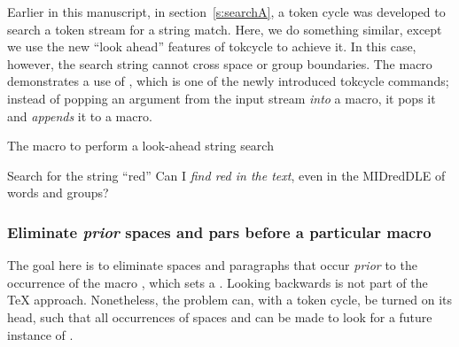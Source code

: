 \documentclass[10pt]{article}
\newcommand\TokCycle{\textsf{tokcycle}}
\begin{document}
Earlier in this manuscript, in section~\ref{s:searchA}, a token cycle
  was developed to search a token stream for a string match.
Here, we do something similar, except we use the new ``look ahead'' features
  of \TokCycle{} to achieve it.
In this case, however, the search string cannot cross space or group
  boundaries.
The  macro demonstrates a use of ,
  which is one of the newly introduced \TokCycle{} commands; instead of 
  popping an argument from the input stream \textit{into} a macro, it pops it 
  and \textit{appends} it to a macro.

\begin{exampleC}[]{The  macro to perform a look{-}ahead string
  search}
\newcommand\findstring[4]{%
  \foundstringfalse%
  \def\poptoks{}%
  \expandafter\matchnextchar\ifx#1#2\relax\relax\fi\empty\relax
  \iffoundstring\addcytoks{#3{#2}}\else\tcpush{\poptoks}#4\fi
}
\def\matchnextchar#1#2\relax{\tctestifx{#1\empty}{}{%
  \tctestifx{\relax#1}{%
    \foundstringtrue%
  }{%
    \tcpeek\Q%
    \tctestifx{\Q\bgroup}{}{%
      \tctestifx{\Q\tcsptoken}{}{%
        \tcpopappto\poptoks%
        \expandafter\tctestifx\expandafter{\Q#1}{%
          \matchnextchar#2\relax%
        }{}%
      }%
    }%
  }%
}}
\end{exampleC}

\begin{exampleA}[lefthand width=8cm]{Search for the string ``red''}
\resettokcycle
{}
\tokencyclexpress 
Can I \textit{find red in the text}, even in the 
  MIDredDLE of words and groups?
\endtokencyclexpress
\end{exampleA}

\endgroup


\subsubsection{Eliminate \textit{prior} spaces and pars before a particular
  macro}

The goal here is to eliminate spaces and paragraphs that occur 
  \textit{prior} to the occurrence of the macro , which 
  sets a .
Looking backwards is not part of the \TeX{} approach.
Nonetheless, the problem can, with a token cycle, be turned on its head,
  such that all occurrences of spaces and  can be made 
  to look for a future instance of .
\end{document}
